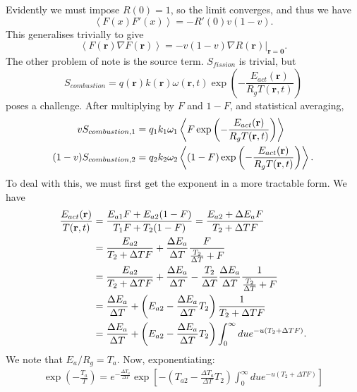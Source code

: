 \documentclass[12pt]{article}
\begin{document}
Evidently we must impose $R(0)=1$, so the limit converges, and thus we have 
\begin{equation}
    \left< F(x)F'(x)\right>=-R'(0)v(1-v).
\end{equation}
This generalises trivially to give 
\begin{equation}
    \left< F(\mathbf{r})\nabla F(\mathbf{r})\right>=-v(1-v) \nabla R(\mathbf{r}) \Bigr|_{\mathbf{r=0}}. \label{ff'}
\end{equation}
The other problem of note is the source term. $S_{fission}$ is trivial, but 
\begin{equation}
S_{combustion}=q(\mathbf{r})k(\mathbf{r})\omega(\mathbf{r},t)\exp{\left(-\frac{E_{act}(\mathbf{r})}{R_g T(\mathbf{r},t)}\right)}
\end{equation}
poses a challenge. After multiplying by $F$ and $1-F$, and statistical averaging,
\begin{align}
    vS_{combustion,1}&=q_1 k_1 \omega_1 \left<F \exp{\left(-\frac{E_{act}(\mathbf{r})}{R_g T(\mathbf{r},t)}\right)}\right> \notag \\
    (1-v)S_{combustion,2}&=q_2 k_2 \omega_2 \left<(1-F) \exp{\left(-\frac{E_{act}(\mathbf{r})}{R_g T(\mathbf{r},t)}\right)}\right>.
      \end{align}
To deal with this, we must first get the exponent in a more tractable form. We have 
\begin{align}
    \frac{E_{act}(\mathbf{r})}{T(\mathbf{r},t)}&=\frac{E_{a1}F+E_{a2}(1-F)}{T_1F+T_2(1-F)} = \frac{E_{a2}+\Delta E_a F}{T_2+\Delta TF} \notag \\
    &=\frac{E_{a2}}{T_2+\Delta TF}+\frac{\Delta E_a}{\Delta T} \frac{F}{\frac{T_2}{\Delta T}+F} \notag \\
    &=\frac{E_{a2}}{T_2+\Delta TF} + \frac{\Delta E_a}{\Delta T}- \frac{T_2}{\Delta T} \frac{\Delta E_a}{\Delta T} \frac{1}{\frac{T_2}{\Delta T}+F} \notag \\
    &=\frac{\Delta E_a}{\Delta T}+\left( E_{a2}-\frac{\Delta E_a}{\Delta T}T_2\right) \frac{1}{T_2 + \Delta T F} \notag \\
    &=\frac{\Delta E_a}{\Delta T}+\left( E_{a2}-\frac{\Delta E_a}{\Delta T}T_2\right) \int _0 ^\infty du e^{-u(T_2+\Delta TF)}.
\end{align}
We note that $E_a/R_g=T_a$. Now, exponentiating: 
\begin{align}
    \exp \left(- \frac{T_a}{T}\right)=e^{-\frac{\Delta T_a}{\Delta T}}\exp{\left[ -\left(T_{a2}-\frac{\Delta T_a}{\Delta T}T_2 \right)\int_0 ^{\infty}due^{-u(T_2+\Delta TF)} \right]}
\end{align}
\end{document}
